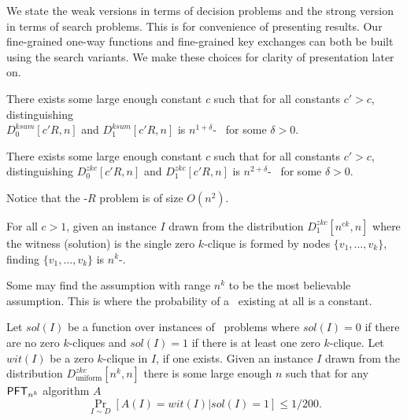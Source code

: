 We state the weak versions in terms of decision problems and the strong version in terms of search problems. This is for convenience of presenting results. Our fine-grained one-way functions and fine-grained key exchanges can both be built using the search variants. We make these choices for clarity of presentation later on. 

\begin{definition}[\Weakksum]\label{def:weak-k-sum}
	There exists some large enough constant $c$ such that for all constants $c'>c$, distinguishing\\$D^{ksum}_{0}[c'R,n]$ and $D^{ksum}_{1}[c'R,n]$ is
$n^{1+\delta}$-\ACIH~ for some $\delta>0$.
\end{definition}

\begin{definition}[\Weakzkc]
	There exists some large enough constant $c$ such that for all constants $c'>c$, distinguishing $D^{zkc}_{0}[c'R,n]$ and $D^{zkc}_{1}[c'R,n]$ is
	$n^{2+\delta}$-\ACIH~ for some $\delta>0$.
	
	Notice that the \zkclique-$R$ problem is of size $O(n^2)$.
\end{definition}



\begin{definition}\label{def:strongzkc}
	For all $c>1$, given an instance $I$ drawn from the distribution $D^{zkc}_{1}[n^{ck},n]$ where the witness (solution) is the single zero $k$-clique is formed by nodes $\{v_1,\ldots,v_k\}$, finding $\{v_1, \ldots, v_k\}$ is $n^k$-\ACSH.
\end{definition}


Some may find the assumption with range $n^k$ to be the most believable assumption. This is where the probability of a \zkclique~existing at all is a constant. %
\begin{definition}[\RandomZKC]
	Let $sol(I)$ be a function over instances of \zkclique~problems where $sol(I)=0$ if there are no zero $k$-cliques and $sol(I)=1$ if there is at least one zero $k$-clique. Let $wit(I)$ be a zero $k$-clique in $I$, if one exists.
	Given an instance $I$ drawn from the distribution $D^{zkc}_{\textrm{uniform}}[n^k,n]$ there is some large enough $n$ such that
	for any  $\mathsf{PFT}_{n^k}$ algorithm $A$
	\[ \Pr_{I \sim D}[A(I) = wit(I)| sol(I)=1] \le 1/200. \]
\end{definition}


